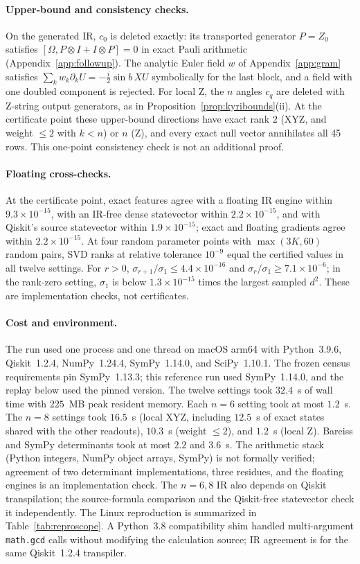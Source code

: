 \paragraph{Upper-bound and consistency checks.}
On the generated IR, $c_0$ is deleted exactly: its transported
generator $P=Z_0$ satisfies $[\Omega,P\otimes I+I\otimes P]=0$ in exact
Pauli arithmetic (Appendix~\ref{app:followup}). The analytic Euler
field $w$ of Appendix~\ref{app:gram} satisfies
$\sum_kw_k\partial_kU=-\frac i2\sin b\,XU$ symbolically for the last
block, and a field with one doubled component is rejected. For local
Z, the $n$ angles $c_q$ are deleted with Z-string output generators,
as in Proposition~\ref{prop:kyribounds}(ii). At the certificate point
these upper-bound directions have exact rank $2$ (XYZ, and weight
$\le2$ with $k<n$) or $n$ (Z), and every exact null vector annihilates
all 45 rows. This
one-point consistency check is not an additional proof.

\paragraph{Floating cross-checks.}
At the certificate point, exact features agree with a floating IR
engine within $9.3\times10^{-15}$, with an IR-free dense statevector
within $2.2\times10^{-15}$, and with Qiskit's source statevector
within $1.9\times10^{-15}$; exact and floating gradients agree within
$2.2\times10^{-15}$. At four random parameter points with
$\max(3K,60)$ random pairs, SVD ranks at relative tolerance $10^{-9}$
equal the certified values in all twelve settings. For $r>0$,
$\sigma_{r+1}/\sigma_1\le4.4\times10^{-16}$ and
$\sigma_r/\sigma_1\ge7.1\times10^{-6}$; in the rank-zero setting,
$\sigma_1$ is below $1.3\times10^{-15}$ times the largest sampled
$d^2$. These are implementation checks, not certificates.

\paragraph{Cost and environment.}
The run used one process and one thread on macOS arm64 with
Python~3.9.6, Qiskit~1.2.4, NumPy~1.24.4, SymPy~1.14.0, and
SciPy~1.10.1. The frozen census requirements pin SymPy~1.13.3; this
reference run used SymPy~1.14.0, and the replay below used the pinned
version.
The twelve settings took $32.4$~s of wall time
with $225$~MB peak resident memory. Each $n=6$ setting took at most
$1.2$~s. The $n=8$ settings took $16.5$~s (local XYZ, including
$12.5$~s of exact states shared with the other readouts), $10.3$~s
(weight $\le2$), and $1.2$~s (local Z). Bareiss and SymPy determinants
took at most $2.2$ and $3.6$~s. The arithmetic stack (Python integers,
NumPy object arrays, SymPy) is not formally verified; agreement of two
determinant implementations, three residues, and the floating engines
is an implementation check. The $n=6,8$ IR also depends on Qiskit
transpilation; the source-formula comparison and the Qiskit-free
statevector check it independently.
The Linux reproduction is summarized in Table~\ref{tab:reproscope}.
A Python~3.8 compatibility shim handled multi-argument
\texttt{math.gcd} calls without modifying the calculation source;
IR agreement is for the same Qiskit~1.2.4 transpiler.

